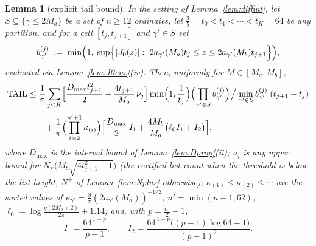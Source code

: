 \documentclass[11pt]{article}
\newtheorem{lemma}{Lemma}
\begin{document}
\begin{lemma}[explicit tail bound]\label{lem:tailexp}
In the setting of Lemma~\ref{lem:diffint}, let
$S\subseteq\{\gamma\le2M_a\}$ be a set of $n\ge12$ ordinates, let
$\tfrac35=t_0<t_1<\cdots<t_K=64$ be any partition, and for a cell
$[t_j,t_{j+1}]$ and $\gamma'\in S$ set
\[
b_{\gamma'}^{(j)}\;:=\;\min\Bigl(1,\;
\sup\Bigl\{|J_0(z)|:\ 2a_{\gamma'}(M_a)t_j\le z\le
2a_{\gamma'}(M_b)t_{j+1}\Bigr\}\Bigr),
\]
evaluated via Lemma~\ref{lem:J0env}(iv). Then, uniformly for
$M\in[M_a,M_b]$,
\begin{align}
\mathrm{TAIL}
&\le\frac1\pi\sum_{j<K}
\Bigl[\frac{D_{\max}t_{j+1}^2}2
+\frac{4t_{j+1}}{M_a}\,\nu_j\Bigr]
\min\Bigl(1,\frac1{t_j}\Bigr)
\Bigl(\prod_{\gamma'\in S}b^{(j)}_{\gamma'}\Bigr)
\Big/\min_{\gamma'\in S}b^{(j)}_{\gamma'}
\;(t_{j+1}-t_j)
\notag\\[2pt]
&\qquad+\frac1\pi\Bigl(\prod_{i=2}^{n'+1}\kappa_{(i)}\Bigr)
\Bigl[\frac{D_{\max}}2\,I_1+\frac{4M_b}{M_a}\bigl(\ell_0I_1+I_2\bigr)
\Bigr],
\label{eq:tailexp}
\end{align}
where $D_{\max}$ is the interval bound of
Lemma~\ref{lem:Dprop}(ii);
$\nu_j$ is any upper bound for
$N_\chi\bigl(M_b\sqrt{4t_{j+1}^2-1}\bigr)$ (the certified list count
when the threshold is below the list height, $N^+$ of
Lemma~\ref{lem:Nplus} otherwise);
$\kappa_{(1)}\le\kappa_{(2)}\le\cdots$ are the sorted values of
$\kappa_{\gamma'}=\tfrac8\pi(2a_{\gamma'}(M_a))^{-1/2}$,
$n'=\min(n-1,62)$;
$\ell_0=\log\tfrac{q(2M_b+2)}{2\pi}+1.14$; and, with
$p=\tfrac{n'}2-1$,
\[
I_1=\frac{64^{\,1-p}}{p-1},\qquad
I_2=\frac{64^{\,1-p}\bigl((p-1)\log64+1\bigr)}{(p-1)^2}.
\]
\end{lemma}
\end{document}
